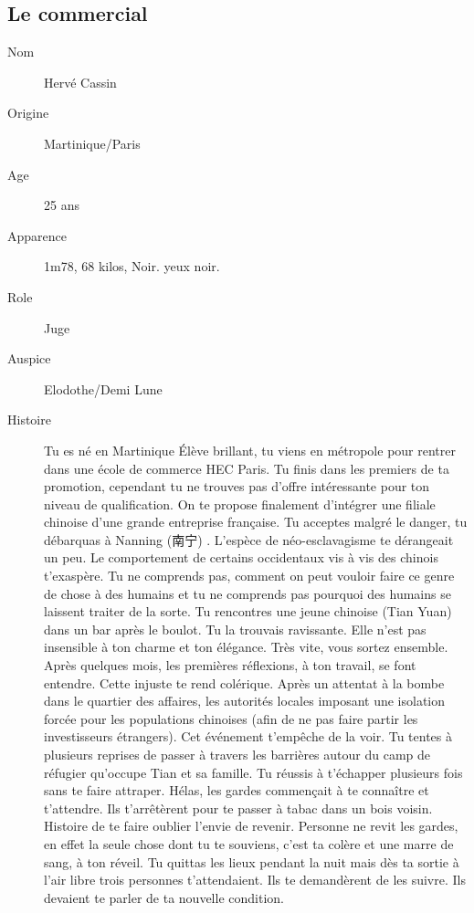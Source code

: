 \documentclass[oneside,12pt]{book}
\begin{document}
\begin{flushleft}
\subsection{Le commercial}
\begin{description}
\item[Nom]{Hervé Cassin}
\item[Origine]{Martinique/Paris}
\item[Age]{ 25 ans}
\item[Apparence]{1m78, 68 kilos, Noir. yeux noir.}
\item[Role]{Juge}
\item[Auspice]{Elodothe/Demi Lune}
\item[Histoire]{Tu es né en Martinique Élève brillant, tu viens en métropole pour rentrer dans une école de commerce HEC Paris. Tu finis dans les premiers de ta promotion, cependant tu ne trouves pas d'offre intéressante pour ton niveau de qualification. On te propose finalement d'intégrer une filiale chinoise d'une grande entreprise française. Tu acceptes malgré le danger, tu débarquas à Nanning ({\CH 南宁}) . L'espèce de néo-esclavagisme te dérangeait un peu. Le comportement de certains occidentaux vis à vis des chinois t'exaspère. Tu ne comprends pas, comment on peut vouloir faire ce genre de chose à des humains et tu ne comprends pas pourquoi des humains se laissent traiter de la sorte. Tu rencontres une jeune chinoise (Tian Yuan) dans un bar après le boulot. Tu la trouvais ravissante. Elle n'est pas insensible à ton charme et ton élégance. Très vite, vous sortez ensemble. Après quelques mois, les premières réflexions, à ton travail, se font entendre. Cette injuste te rend colérique. Après un attentat à la bombe dans le quartier des affaires, les autorités locales imposant une isolation forcée pour les populations chinoises (afin  de ne pas faire partir les investisseurs étrangers). Cet événement t'empêche de la voir.  Tu tentes à plusieurs reprises de passer à travers les barrières autour du camp de réfugier qu'occupe Tian et sa famille. Tu réussis à t'échapper plusieurs fois sans te faire attraper. Hélas, les gardes commençait à te connaître et t'attendre. Ils t'arrêtèrent pour te passer à tabac dans un bois voisin. Histoire de te faire oublier l'envie de revenir. Personne ne revit les gardes, en effet la seule chose dont tu te souviens, c'est ta colère et une marre de sang, à ton réveil. Tu quittas les lieux pendant la nuit mais dès ta sortie à l'air libre trois personnes t'attendaient. Ils te demandèrent de les suivre. Ils devaient te parler de ta nouvelle condition.  }
\end{description}
\clearpage


\end{flushleft}
\end{document}
